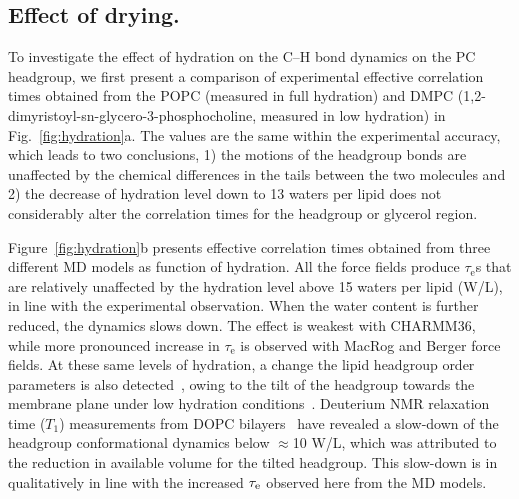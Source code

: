 \documentclass[journal=jpcbfk,manuscript=article,layout=twocolumn]{achemso}
\begin{document}
\subsection*{Effect of drying.}
To investigate the effect of hydration on the C--H bond dynamics on the PC headgroup, we first present a comparison of experimental effective correlation times obtained from the POPC (measured in full hydration) and DMPC (1,2-dimyristoyl-sn-glycero-3-phosphocholine, measured in low hydration) in Fig.~\ref{fig:hydration}a. The values are the same within the experimental accuracy, which leads to two conclusions, 1) the motions of the headgroup bonds are unaffected by the chemical differences in the tails between the two molecules and 2) the decrease of hydration level down to 13 waters per lipid does not considerably alter the correlation times for the headgroup or glycerol region. 

Figure~\ref{fig:hydration}b presents effective correlation times obtained from three different MD models as function of hydration. All the force fields produce $\tau_\mathrm{e}$s that are relatively unaffected by the hydration level above 15 waters per lipid (W/L), in line with the experimental observation. When the water content is further reduced, the dynamics slows down. The effect is weakest with CHARMM36, while more  pronounced increase in $\tau_\mathrm{e}$ is observed with MacRog and Berger force fields. At these same levels of hydration, a change the lipid headgroup order parameters is also detected~\cite{botan15}, owing to the tilt of the headgroup towards the membrane plane under low hydration conditions~\cite{bechinger91}. Deuterium NMR relaxation time ($T_{1}$) measurements from DOPC bilayers~\cite{ulrich94} have revealed a slow-down of the headgroup conformational dynamics below $\approx$10 W/L, which was attributed to the reduction in available volume for the tilted headgroup. This slow-down is in qualitatively in line with the increased $\tau_{\rm{e}}$ observed here from the MD models. 



  
\end{document}
